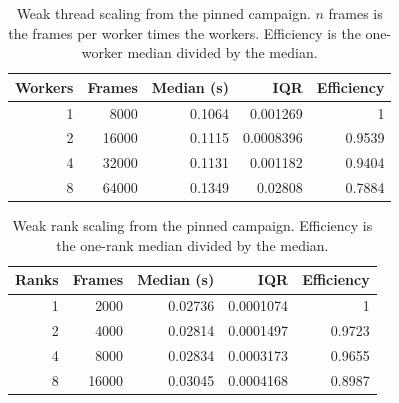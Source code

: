 \begin{table}[tbp]
\centering
\footnotesize
\caption{Weak thread scaling from the pinned campaign. \(n\) frames is the frames per worker times the workers. Efficiency is the one-worker median divided by the median.}
\label{tab:weak-threads}
\begin{tabular}{@{}rrrrr@{}}
\toprule
Workers & Frames & Median (s) & IQR & Efficiency \\
\midrule
1 & 8000 & 0.1064 & 0.001269 & 1 \\
2 & 16000 & 0.1115 & 0.0008396 & 0.9539 \\
4 & 32000 & 0.1131 & 0.001182 & 0.9404 \\
8 & 64000 & 0.1349 & 0.02808 & 0.7884 \\
\bottomrule
\end{tabular}
\end{table}

\begin{table}[tbp]
\centering
\footnotesize
\caption{Weak rank scaling from the pinned campaign. Efficiency is the one-rank median divided by the median.}
\label{tab:weak-ranks}
\begin{tabular}{@{}rrrrr@{}}
\toprule
Ranks & Frames & Median (s) & IQR & Efficiency \\
\midrule
1 & 2000 & 0.02736 & 0.0001074 & 1 \\
2 & 4000 & 0.02814 & 0.0001497 & 0.9723 \\
4 & 8000 & 0.02834 & 0.0003173 & 0.9655 \\
8 & 16000 & 0.03045 & 0.0004168 & 0.8987 \\
\bottomrule
\end{tabular}
\end{table}

